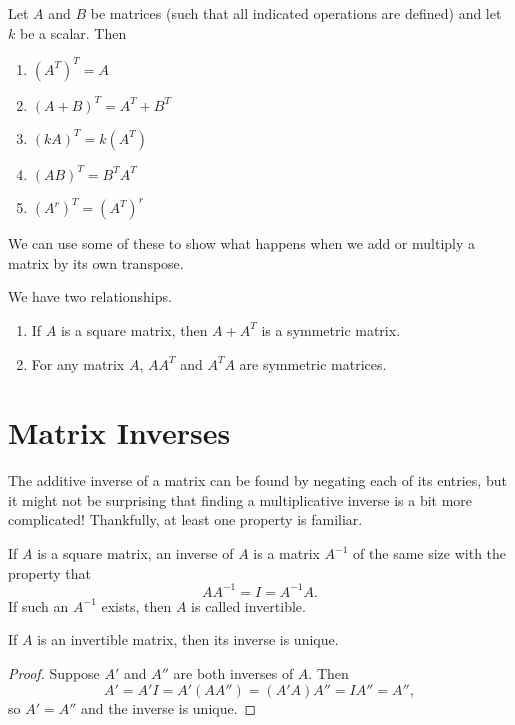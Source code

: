 \documentclass[../m073main.tex]{subfiles}
\begin{document}
\begin{theorem}
	Let $A$ and $B$ be matrices (such that all indicated operations are defined) and let $k$ be a scalar.
	Then
	\begin{enumerate}[label=(\alph*)]
		\item $(A^T)^T = A$
		\item $(A+B)^T = A^T + B^T$
		\item $(kA)^T = k(A^T)$
		\item $(AB)^T = B^TA^T$
		\item $(A^r)^T = (A^T)^r$
	\end{enumerate}
\end{theorem}

We can use some of these to show what happens when we add or multiply a matrix by its own transpose.

\begin{theorem}
	We have two relationships.
	\begin{enumerate}[label=(\alph*)]
		\item If $A$ is a square matrix, then $A + A^T$ is a symmetric matrix.
		\item For any matrix $A$, $AA^T$ and $A^TA$ are symmetric matrices.
	\end{enumerate}
\end{theorem}

\section{Matrix Inverses}
The additive inverse of a matrix can be found by negating each of its entries, but it might not be surprising that finding a multiplicative inverse is a bit more complicated!
Thankfully, at least one property is familiar.

\begin{definition}
	If $A$ is a square matrix, an inverse of $A$ is a matrix $A^{-1}$ of the same size with the property that
	\[ A A^{-1} = I = A^{-1} A. \]
	If such an $A^{-1}$ exists, then $A$ is called invertible.
\end{definition}

\begin{theorem}
	If $A$ is an invertible matrix, then its inverse is unique.
\end{theorem}

\begin{proof}
	Suppose $A'$ and $A''$ are both inverses of $A$.
	Then
	\[ A' = A'I = A'(AA'') = (A'A)A'' = IA'' = A'', \]
	so $A' = A''$ and the inverse is unique.
\end{proof}
\end{document}
